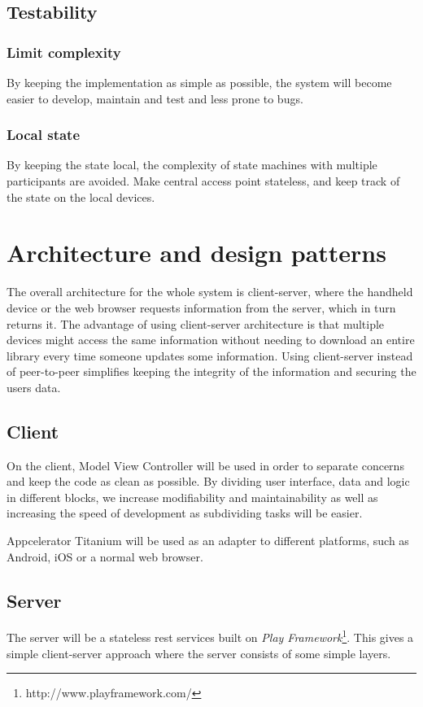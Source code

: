 \documentclass[11pt]{book}
\begin{document}
\subsection{Testability}

\subsubsection{Limit complexity}
By keeping the implementation as simple as possible, the system will become easier to develop, maintain and test and less prone to bugs.

\subsubsection{Local state}
By keeping the state local, the complexity of state machines with multiple participants are avoided. Make central access point stateless, and keep track of the state on the local devices.

\section{Architecture and design patterns}

The overall architecture for the whole system is client-server, where the handheld device or the web browser requests information from the server, which in turn returns it. The advantage of using client-server architecture is that multiple devices might access the same information without needing to download an entire library every time someone updates some information. Using client-server instead of peer-to-peer simplifies keeping the integrity of the information and securing the users data.

\subsection{Client}
On the client, Model View Controller will be used in order to separate concerns and keep the code as clean as possible. By dividing user interface, data and logic in different blocks, we increase modifiability and maintainability as well as increasing the speed of development as subdividing tasks will be easier.

Appcelerator Titanium will be used as an adapter to different platforms, such as Android, iOS or a normal web browser.

\subsection{Server}
The server will be a stateless \gls{rest} services built on \emph{Play Framework}\footnote{http://www.playframework.com/}. This gives a simple client-server approach where the server consists of some simple layers.
\end{document}
